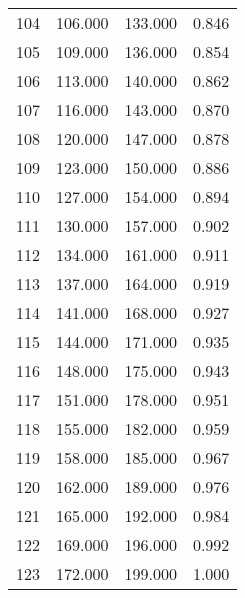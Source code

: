 \begin{tabular}{cccc}
  104 & 106.000 & 133.000 & 0.846 \\ 
  105 & 109.000 & 136.000 & 0.854 \\ 
  106 & 113.000 & 140.000 & 0.862 \\ 
  107 & 116.000 & 143.000 & 0.870 \\ 
  108 & 120.000 & 147.000 & 0.878 \\ 
  109 & 123.000 & 150.000 & 0.886 \\ 
  110 & 127.000 & 154.000 & 0.894 \\ 
  111 & 130.000 & 157.000 & 0.902 \\ 
  112 & 134.000 & 161.000 & 0.911 \\ 
  113 & 137.000 & 164.000 & 0.919 \\ 
  114 & 141.000 & 168.000 & 0.927 \\ 
  115 & 144.000 & 171.000 & 0.935 \\ 
  116 & 148.000 & 175.000 & 0.943 \\ 
  117 & 151.000 & 178.000 & 0.951 \\ 
  118 & 155.000 & 182.000 & 0.959 \\ 
  119 & 158.000 & 185.000 & 0.967 \\ 
  120 & 162.000 & 189.000 & 0.976 \\ 
  121 & 165.000 & 192.000 & 0.984 \\ 
  122 & 169.000 & 196.000 & 0.992 \\ 
  123 & 172.000 & 199.000 & 1.000 \\ 
   \hline
\end{tabular}

